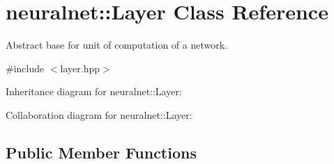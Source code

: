 \hypertarget{classneuralnet_1_1Layer}{}\section{neuralnet\+:\+:Layer Class Reference}
\label{classneuralnet_1_1Layer}


Abstract base for unit of computation of a network.  




{\ttfamily \#include $<$layer.\+hpp$>$}



Inheritance diagram for neuralnet\+:\+:Layer\+:


Collaboration diagram for neuralnet\+:\+:Layer\+:
\subsection*{Public Member Functions}
